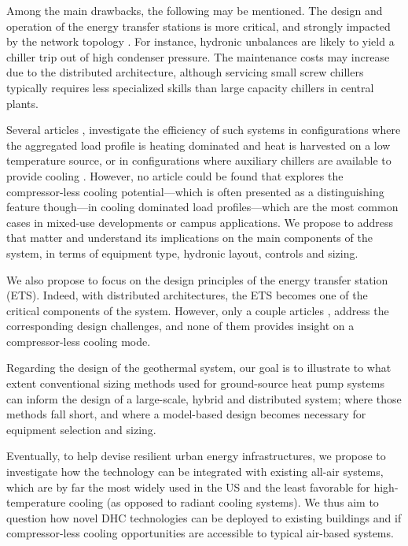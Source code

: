Among the main drawbacks, the following may be mentioned.
The design and operation of the energy transfer stations is more critical, and strongly impacted by the network topology \citep{Wetter2019}. For instance, hydronic unbalances are likely to yield a chiller trip out of high condenser pressure.
The maintenance costs may increase due to the distributed architecture, although servicing small screw chillers typically requires less specialized skills than large capacity chillers in central plants.

Several articles \citep{Wetter2019}, \citep{Sommer2020} investigate the efficiency of such systems in configurations where the aggregated load profile is heating dominated and heat is harvested on a low temperature source, or in configurations where auxiliary chillers are available to provide cooling \citep{Gabrielli2020}.
However, no article could be found that explores the compressor-less cooling potential---which is often presented as a distinguishing feature though---in cooling dominated load profiles---which are the most common cases in mixed-use developments or campus applications.
We propose to address that matter and understand its implications on the main components of the system, in terms of equipment type, hydronic layout, controls and sizing.

We also propose to focus on the design principles of the energy transfer station (ETS).
Indeed, with distributed architectures, the ETS becomes one of the critical components of the system.
However, only a couple articles \citep{Buffa2020}, \citep{Wetter2019} address the corresponding design challenges, and none of them provides insight on a compressor-less cooling mode.

Regarding the design of the geothermal system, our goal is to illustrate to what extent conventional sizing methods used for ground-source heat pump systems \citep{Kavanaugh2014} can inform the design of a large-scale, hybrid and distributed system; where those methods fall short, and where a model-based design becomes necessary for equipment selection and sizing.

Eventually, to help devise resilient urban energy infrastructures, we propose to investigate how the technology can be integrated with existing all-air systems, which are by far the most widely used in the US and the least favorable for high-temperature cooling (as opposed to radiant cooling systems).
We thus aim to question how novel DHC technologies can be deployed to existing buildings and if compressor-less cooling opportunities are accessible to typical air-based systems.

